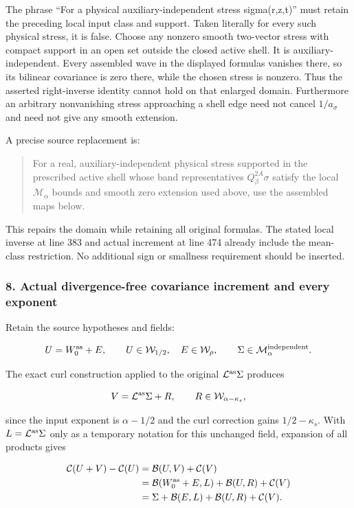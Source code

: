 \documentclass[10pt,a4paper]{article}
\begin{document}
The phrase ``For a physical auxiliary-independent stress sigma(r,z,t)'' must retain the preceding local input class and support. Taken literally for every such physical stress, it is false. Choose any nonzero smooth two-vector stress with compact support in an open set outside the closed active shell. It is auxiliary-independent. Every assembled wave in the displayed formulas vanishes there, so its bilinear covariance is zero there, while the chosen stress is nonzero. Thus the asserted right-inverse identity cannot hold on that enlarged domain. Furthermore an arbitrary nonvanishing stress approaching a shell edge need not cancel \(1/a_\sigma\) and need not give any smooth extension.

A precise source replacement is:

\begin{quote}
For a real, auxiliary-independent physical stress supported in the prescribed active shell whose band representatives \(Q_\beta^{2A}\sigma\) satisfy the local \(\mathcal M_\alpha\) bounds and smooth zero extension used above, use the assembled maps below.
\end{quote}

This repairs the domain while retaining all original formulas. The stated local inverse at line 383 and actual increment at line 474 already include the mean-class restriction. No additional sign or smallness requirement should be inserted.

\subsubsection{8. Actual divergence-free covariance increment and every exponent}

Retain the source hypotheses and fields:

\[
U=W_0^{\rm as}+E,\qquad U\in\mathcal W_{1/2},\quad E\in\mathcal W_\rho,
\qquad \Sigma\in\mathcal M_\alpha^{\rm independent}.
\]

The exact curl construction applied to the original \(\mathcal L^{\rm as}\Sigma\) produces

\[
V=\mathcal L^{\rm as}\Sigma+R,
\qquad R\in\mathcal W_{\alpha-\kappa_s},
\]

since the input exponent is \(\alpha-1/2\) and the curl correction gains \(1/2-\kappa_s\). With \(L=\mathcal L^{\rm as}\Sigma\) only as a temporary notation for this unchanged field, expansion of all products gives

\[
\begin{aligned}
\mathcal C(U+V)-\mathcal C(U)
&=\mathcal B(U,V)+\mathcal C(V)\\
&=\mathcal B(W_0^{\rm as}+E,L)+\mathcal B(U,R)+\mathcal C(V)\\
&=\Sigma+\mathcal B(E,L)+\mathcal B(U,R)+\mathcal C(V).
\end{aligned}
\]
\end{document}

